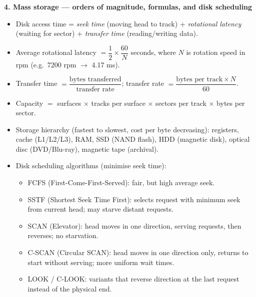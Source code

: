 \documentclass[11pt]{article}
\newcommand{\cle}[1]{{\popxbold\color{popdark}#1}}
\begin{document}
\begin{bilan}
\textbf{4. Mass storage --- orders of magnitude, formulas, and disk scheduling}
\begin{itemize}
\item \cle{Disk access time} = \emph{seek time} (moving head to track) + \emph{rotational latency} (waiting for sector) + \emph{transfer time} (reading/writing data).
\item \cle{Average rotational latency} $= \dfrac{1}{2}\times\dfrac{60}{N}$ seconds, where $N$ is rotation speed in rpm (e.g.\ 7200 rpm $\rightarrow$ 4.17 ms).
\item \cle{Transfer time} $= \dfrac{\text{bytes transferred}}{\text{transfer rate}}$; transfer rate $= \dfrac{\text{bytes per track} \times N}{60}$.
\item \cle{Capacity} $=$ surfaces $\times$ tracks per surface $\times$ sectors per track $\times$ bytes per sector.
\item \cle{Storage hierarchy} (fastest to slowest, cost per byte decreasing): registers, cache (L1/L2/L3), RAM, SSD (NAND flash), HDD (magnetic disk), optical disc (DVD/Blu-ray), magnetic tape (archival).
\item \cle{Disk scheduling algorithms} (minimise seek time):
  \begin{itemize}
  \item FCFS (First-Come-First-Served): fair, but high average seek.
  \item SSTF (Shortest Seek Time First): selects request with minimum seek from current head; may starve distant requests.
  \item SCAN (Elevator): head moves in one direction, serving requests, then reverses; no starvation.
  \item C-SCAN (Circular SCAN): head moves in one direction only, returns to start without serving; more uniform wait times.
  \item LOOK / C-LOOK: variants that reverse direction at the last request instead of the physical end.
  \end{itemize}
\end{itemize}


\end{bilan}
\end{document}
